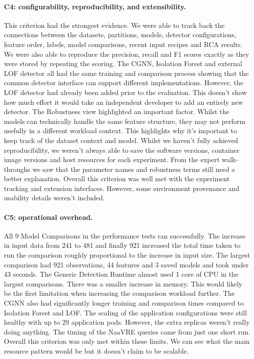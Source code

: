 \paragraph{C4: configurability, reproducibility, and extensibility.}

This criterion had the strongest evidence. We were able to track back the connections between the datasets, partitions, models, detector configurations, feature order, labels, model comparisons, recent input recipes and RCA results. We were also able to reproduce the precision, recall and F1 scores exactly as they were stored by repeating the scoring. The CGNN, Isolation Forest and external LOF detector all had the same training and comparison process showing that the common detector interface can support different implementations. However, the LOF detector had already been added prior to the evaluation. This doesn’t show how much effort it would take an independent developer to add an entirely new detector. The Robustness view highlighted an important factor. Whilst the models can technically handle the same feature structure, they may not perform usefully in a different workload context. This highlights why it’s important to keep track of the dataset context and model. Whilst we haven’t fully achieved reproducibility, we weren’t always able to save the software versions, container image versions and host resources for each experiment. From the expert walk-throughs we saw that the parameter names and robustness terms still need a better explanation. Overall this criterion was well met with the experiment tracking and extension interfaces. However, some environment provenance and usability details weren’t included.

\paragraph{C5: operational overhead.}

All 9 Model Comparisons in the performance tests ran successfully. The increase in input data from 241 to 481 and finally 921 increased the total time taken to run the comparison roughly proportional to the increase in input size. The largest comparison had 921 observations, 44 features and 3 saved models and took under 43 seconds. The Generic Detection Runtime almost used 1 core of CPU in the largest comparisons. There was a smaller increase in memory. This would likely be the first limitation when increasing the comparison workload further. The CGNN also had significantly longer training and comparison times compared to Isolation Forest and LOF. The scaling of the application configurations were still healthy with up to 29 application pods. However, the extra replicas weren’t really doing anything. The timing of the NaaVRE queries came from just one short run. Overall this criterion was only met within these limits. We can see what the main resource pattern would be but it doesn’t claim to be scalable.

